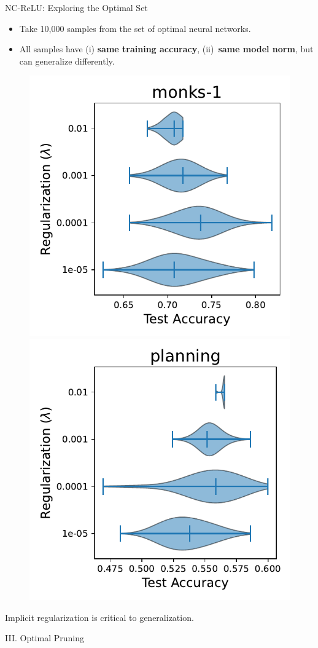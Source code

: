 \documentclass[usenames,dvipsnames,mathserif,notheorems]{beamer}
\newcommand{\good}[1]{\textcolor{good}{#1}}
\begin{document}
\begin{frame}{NC-ReLU: Exploring the Optimal Set}
	\begin{itemize}
		\item Take 10,000 samples from the set of optimal neural networks.
		      \pause
		\item All samples have (i) \textbf{same training accuracy},
		      (ii)~\textbf{same model norm}, but can generalize differently.
		      \pause
	\end{itemize}

	\begin{figure}[t]
		\centering
		\includegraphics[width=0.48\linewidth]{assets/dist_paper_monks-1.pdf}
		\includegraphics[width=0.48\linewidth]{assets/dist_paper_planning.pdf}
	\end{figure}

	\pause
	\begin{center}
		\good{Implicit regularization} is critical to generalization.
	\end{center}

\end{frame}



\begin{frame}{}
	\begin{center}
		\huge III. Optimal Pruning
	\end{center}
\end{frame}
\end{document}
